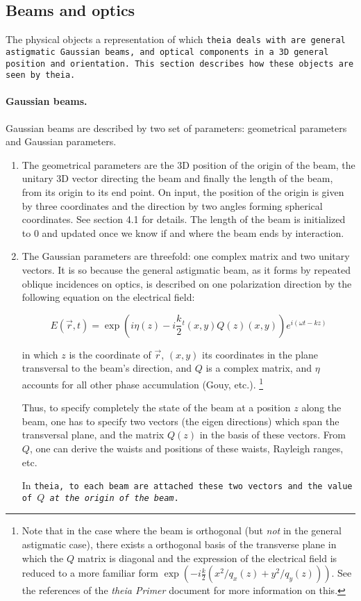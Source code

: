 \documentclass{article}
\begin{document}
\subsection{Beams and optics}
The physical objects a representation of which \tt{theia} deals with are general astigmatic Gaussian beams, and optical components in a 3D general position and orientation. This section describes how these objects are seen by \tt{theia}.



\paragraph{Gaussian beams.}Gaussian beams are described by two set of parameters: geometrical parameters and Gaussian parameters. 

\begin{enumerate}
\item The geometrical parameters are the 3D position of the origin of the beam, the unitary 3D vector directing the beam and finally the length of the beam, from its origin to its end point. On input, the position of the origin is given by three coordinates and the direction by two angles forming spherical coordinates. See section 4.1 for details. The length of the beam is initialized to 0 and updated once we know if and where the beam ends by interaction.

\item The Gaussian parameters are threefold: one complex matrix and two unitary vectors. It is so because the general astigmatic beam, as it forms by repeated oblique incidences on optics, is described on one polarization direction by the following equation on the electrical field:

$$ E(\vec r , t) = \exp(i\eta(z) -i\frac{k}{2} {}^t(x,y)Q(z)(x,y))e^{i(\omega t - kz)} $$

in which $z$ is the coordinate of $\vec r$, $(x,y)$ its coordinates in the plane transversal to the beam's direction, and $Q$ is a complex matrix, and $\eta$ accounts for all other phase accumulation (Gouy, etc.). \footnote{Note that in the case where the beam is orthogonal (but \textit{not} in the general astigmatic case), there exists a orthogonal basis of the transverse plane in which the $Q$ matrix is diagonal and the expression of the electrical field is reduced to a more familiar form $\exp(-i\frac{k}{2} (x^2/q_x(z) + y^2/q_y(z)))$. See the references of the \textit{theia Primer} document for more information on this.}

Thus, to specify completely the state of the beam at a position $z$ along the beam, one has to specify two vectors (the eigen directions) which span the transversal plane, and the matrix $Q(z)$ in the basis of these vectors. From $Q$, one can derive the waists and positions of these waists, Rayleigh ranges, etc.

In \tt{theia}, to each beam are attached these two vectors and the value of $Q$ \textit{at the origin of the beam}.
\end{enumerate}
\end{document}
